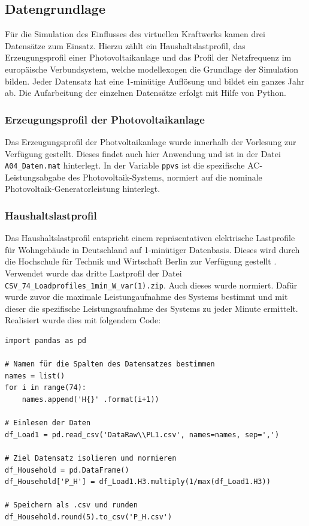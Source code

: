 \subsection{Datengrundlage}

Für die Simulation des Einflusses des virtuellen Kraftwerks kamen drei Datensätze zum Einsatz. Hierzu zählt ein Haushaltslastprofil, das Erzeugungsprofil einer Photovoltaikanlage und das Profil der Netzfrequenz im europäische Verbundsystem, welche modellexogen die Grundlage der Simulation bilden. Jeder Datensatz hat eine 1-minütige Auflösung und bildet ein ganzes Jahr ab. Die Aufarbeitung der einzelnen Datensätze erfolgt mit Hilfe von Python.

\subsubsection{Erzeugungsprofil der Photovoltaikanlage}

Das Erzeugungsprofil der Photvoltaikanlage wurde innerhalb der Vorlesung zur Verfügung gestellt. Dieses findet auch hier Anwendung und ist in der Datei \texttt{A04\_Daten.mat} hinterlegt. In der Variable \texttt{ppvs} ist die spezifische AC-Leistungsabgabe des Photovoltaik-Systems, normiert auf die nominale Photovoltaik-Generatorleistung hinterlegt.

\subsubsection{Haushaltslastprofil}

Das Haushaltslastprofil entspricht einem repräsentativen elektrische Lastprofile für Wohngebäude in Deutschland auf 1-minütiger Datenbasis. Dieses wird durch die Hochschule für Technik und Wirtschaft Berlin zur Verfügung gestellt \parencite{htwLast18}.\\
Verwendet wurde das dritte Lastprofil der Datei \texttt{CSV\_74\_Loadprofiles\_1min\_W\_var(1).zip}. Auch dieses wurde normiert. Dafür wurde zuvor die maximale Leistungaufnahme des Systems bestimmt und mit dieser die spezifische Leistungsaufnahme des Systems zu jeder Minute ermittelt.\medskip\\
Realisiert wurde dies mit folgendem Code:

\begin{code}
\label{code:household}
\begin{verbatim}
import pandas as pd

# Namen für die Spalten des Datensatzes bestimmen
names = list()
for i in range(74):
    names.append('H{}' .format(i+1))
    
# Einlesen der Daten
df_Load1 = pd.read_csv('DataRaw\\PL1.csv', names=names, sep=',')

# Ziel Datensatz isolieren und normieren
df_Household = pd.DataFrame()
df_Household['P_H'] = df_Load1.H3.multiply(1/max(df_Load1.H3))

# Speichern als .csv und runden
df_Household.round(5).to_csv('P_H.csv')
\end{verbatim}
\end{code}


